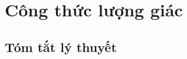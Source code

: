 \setcounter{section}{1}
\section{Công thức lượng giác}
\subsection{Tóm tắt lý thuyết}
\begin{tomtat}

\end{tomtat}
